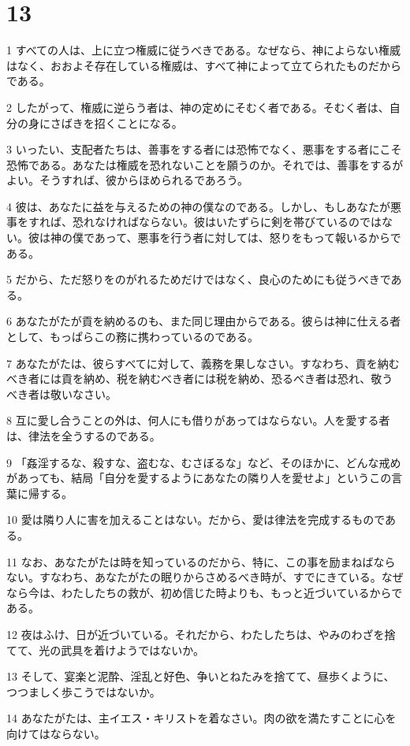 \chapter{13}

\par 1 すべての人は、上に立つ権威に従うべきである。なぜなら、神によらない権威はなく、おおよそ存在している権威は、すべて神によって立てられたものだからである。
\par 2 したがって、権威に逆らう者は、神の定めにそむく者である。そむく者は、自分の身にさばきを招くことになる。
\par 3 いったい、支配者たちは、善事をする者には恐怖でなく、悪事をする者にこそ恐怖である。あなたは権威を恐れないことを願うのか。それでは、善事をするがよい。そうすれば、彼からほめられるであろう。
\par 4 彼は、あなたに益を与えるための神の僕なのである。しかし、もしあなたが悪事をすれば、恐れなければならない。彼はいたずらに剣を帯びているのではない。彼は神の僕であって、悪事を行う者に対しては、怒りをもって報いるからである。
\par 5 だから、ただ怒りをのがれるためだけではなく、良心のためにも従うべきである。
\par 6 あなたがたが貢を納めるのも、また同じ理由からである。彼らは神に仕える者として、もっぱらこの務に携わっているのである。
\par 7 あなたがたは、彼らすべてに対して、義務を果しなさい。すなわち、貢を納むべき者には貢を納め、税を納むべき者には税を納め、恐るべき者は恐れ、敬うべき者は敬いなさい。
\par 8 互に愛し合うことの外は、何人にも借りがあってはならない。人を愛する者は、律法を全うするのである。
\par 9 「姦淫するな、殺すな、盗むな、むさぼるな」など、そのほかに、どんな戒めがあっても、結局「自分を愛するようにあなたの隣り人を愛せよ」というこの言葉に帰する。
\par 10 愛は隣り人に害を加えることはない。だから、愛は律法を完成するものである。
\par 11 なお、あなたがたは時を知っているのだから、特に、この事を励まねばならない。すなわち、あなたがたの眠りからさめるべき時が、すでにきている。なぜなら今は、わたしたちの救が、初め信じた時よりも、もっと近づいているからである。
\par 12 夜はふけ、日が近づいている。それだから、わたしたちは、やみのわざを捨てて、光の武具を着けようではないか。
\par 13 そして、宴楽と泥酔、淫乱と好色、争いとねたみを捨てて、昼歩くように、つつましく歩こうではないか。
\par 14 あなたがたは、主イエス・キリストを着なさい。肉の欲を満たすことに心を向けてはならない。

